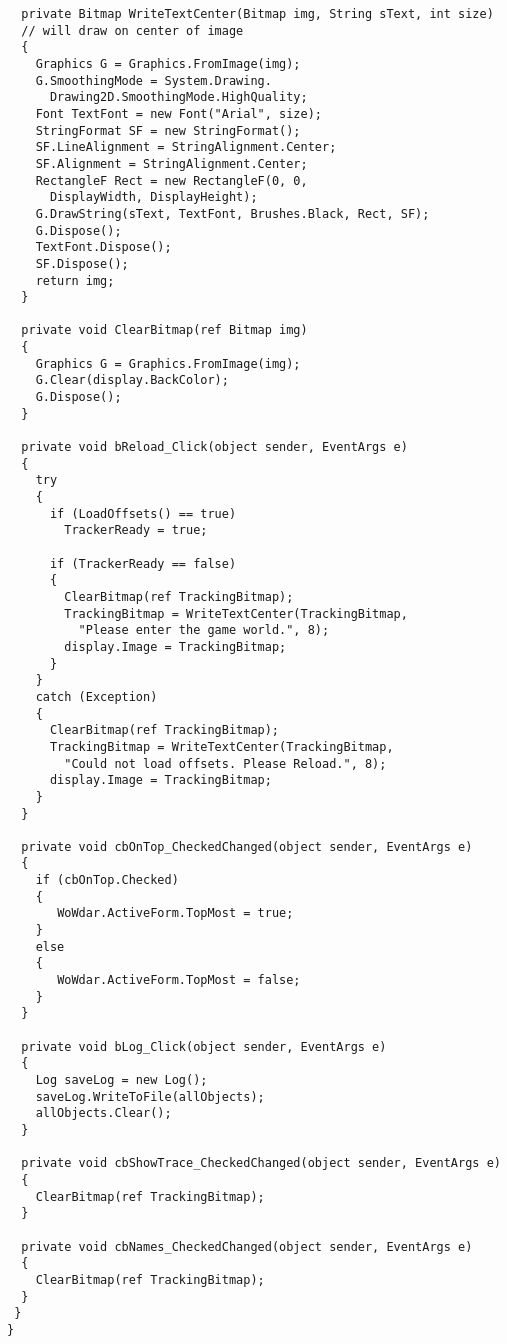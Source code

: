 \begin{lstlisting}
  private Bitmap WriteTextCenter(Bitmap img, String sText, int size)  
  // will draw on center of image
  {
    Graphics G = Graphics.FromImage(img);
    G.SmoothingMode = System.Drawing.
      Drawing2D.SmoothingMode.HighQuality;
    Font TextFont = new Font("Arial", size);
    StringFormat SF = new StringFormat();
    SF.LineAlignment = StringAlignment.Center;
    SF.Alignment = StringAlignment.Center;
    RectangleF Rect = new RectangleF(0, 0, 
      DisplayWidth, DisplayHeight);
    G.DrawString(sText, TextFont, Brushes.Black, Rect, SF);
    G.Dispose();
    TextFont.Dispose();
    SF.Dispose();
    return img;
  }

  private void ClearBitmap(ref Bitmap img)
  {
    Graphics G = Graphics.FromImage(img);
    G.Clear(display.BackColor);
    G.Dispose();
  }

  private void bReload_Click(object sender, EventArgs e)
  {
    try
    {
      if (LoadOffsets() == true)
        TrackerReady = true;

      if (TrackerReady == false)
      {
        ClearBitmap(ref TrackingBitmap);
        TrackingBitmap = WriteTextCenter(TrackingBitmap, 
          "Please enter the game world.", 8);
        display.Image = TrackingBitmap;
      }
    }
    catch (Exception)
    {
      ClearBitmap(ref TrackingBitmap);
      TrackingBitmap = WriteTextCenter(TrackingBitmap, 
        "Could not load offsets. Please Reload.", 8);
      display.Image = TrackingBitmap;
    }  
  }

  private void cbOnTop_CheckedChanged(object sender, EventArgs e)
  {
    if (cbOnTop.Checked)
    {
       WoWdar.ActiveForm.TopMost = true;
    }
    else
    {
       WoWdar.ActiveForm.TopMost = false;
    }
  }

  private void bLog_Click(object sender, EventArgs e)
  {
    Log saveLog = new Log();
    saveLog.WriteToFile(allObjects);
    allObjects.Clear();
  }

  private void cbShowTrace_CheckedChanged(object sender, EventArgs e)
  {
    ClearBitmap(ref TrackingBitmap);
  }

  private void cbNames_CheckedChanged(object sender, EventArgs e)
  {
    ClearBitmap(ref TrackingBitmap);
  }
 }
}

\end{lstlisting}

